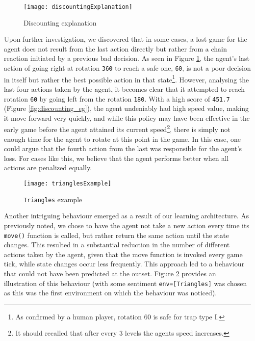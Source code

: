 \begin{figure}[h]
    \centering
    \texttt{[image: discountingExplanation]}
    \caption{Discounting explanation}
    \label{fig:discounting_expl}
\end{figure}

Upon further investigation, we discovered that in some cases, a lost game for the agent does not result from the last action directly but rather from a chain reaction initiated by a previous bad decision. As seen in Figure \ref{fig:discounting_expl}, the agent's last action of going right at rotation \texttt{360} to reach a safe one, \texttt{60}, is not a poor decision in itself but rather the best possible action in that state\footnote{As confirmed by a human player, rotation 60 is safe for trap type I.}. However, analysing the last four actions taken by the agent, it becomes clear that it attempted to reach rotation \texttt{60} by going left from the rotation \texttt{180}. With a high score of \texttt{451.7} (Figure \ref{fig:discounting_eg}), the agent undeniably had high speed value, making it move forward very quickly, and while this policy may have been effective in the early game before the agent attained its current speed\footnote{It should recalled that after every 3 levels the agents speed increases.}, there is simply not enough time for the agent to rotate at this point in the game. In this case, one could argue that the fourth action from the last was responsible for the agent's loss. For cases like this, we believe that the agent performs better when all actions are penalized equally.

\begin{figure}[h]
    \centering
    \texttt{[image: trianglesExample]}
    \caption{\texttt{Triangles} example}
    \label{fig:triangles_intbeh_eg}
\end{figure}

Another intriguing behaviour emerged as a result of our learning architecture. As previously noted, we chose to have the agent not take a new action every time its \texttt{move()} function is called, but rather return the same action until the state changes. This resulted in a substantial reduction in the number of different actions taken by the agent, given that the move function is invoked every game tick, while state changes occur less frequently. This approach led to a behaviour that could not have been predicted at the outset. Figure \ref{fig:triangles_intbeh_eg} provides an illustration of this behaviour (with some sentiment \texttt{env=[Triangles]} was chosen as this was the first environment on which the behaviour was noticed).

